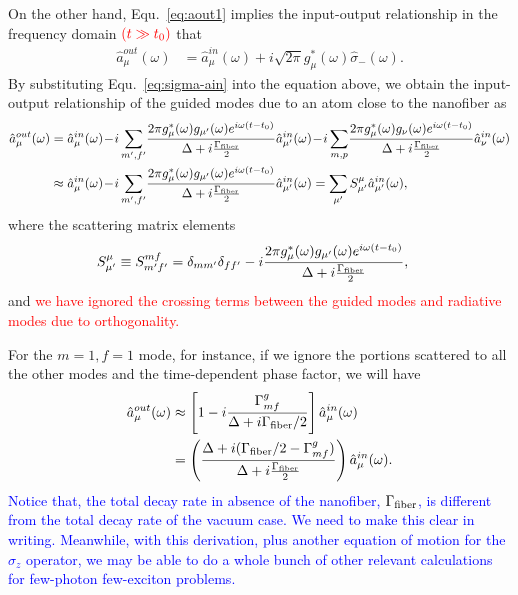\documentclass[preprint,aps,pra,onecolumn]{revtex4-1} %
\begin{document}
On the other hand, Equ.~\ref{eq:aout1} implies the input-output relationship in the frequency domain $\mathbin{\color{red}{(t\gg t_0)}}$ that
\begin{align}
\hat{a}^{out}_\mu(\omega ) &= \hat{a}^{in}_\mu(\omega) +i \sqrt{2\pi}g_\mu^*(\omega)\hat{\sigma}_-(\omega). 
\end{align}
By substituting Equ.~\ref{eq:sigma-ain} into the equation above, we obtain the input-output relationship of the guided modes due to an atom close to the nanofiber as
\begin{align}
\hat{a}^{out}_\mu(\omega) &= \hat{a}^{in}_\mu (\omega) \!-\! i\sum_{m',f'}\!\frac{2\pi g_\mu^*(\omega)g_{\mu'}(\omega)e^{i\omega(t-t_0)}}{\Delta+i\frac{\Gamma_{\rm fiber}}{2}}\hat{a}^{in}_{\mu'}(\omega) \!-\! i\sum_{m,p}\!\frac{2\pi g_\mu^*(\omega)g_{\nu}(\omega)e^{i\omega(t-t_0)}}{\Delta+i\frac{\Gamma_{\rm fiber}}{2}}\hat{a}^{in}_{\nu}(\omega)\\
&\approx \hat{a}^{in}_\mu (\omega) \!-\! i\sum_{m',f'}\!\frac{2\pi g_\mu^*(\omega)g_{\mu'}(\omega)e^{i\omega(t-t_0)}}{\Delta+i\frac{\Gamma_{\rm fiber}}{2}}\hat{a}^{in}_{\mu'}(\omega)=\sum_{\mu'}S^\mu_{\mu'}\hat{a}^{in}_{\mu'}(\omega),
\end{align}
where the scattering matrix elements
\begin{align}\label{eq:Smfmft}
S^\mu_{\mu'} &\equiv S^{mf}_{m'f'}=\delta_{mm'}\delta_{ff'}-i\frac{2\pi g_\mu^*(\omega)g_{\mu'}(\omega)e^{i\omega(t-t_0)}}{\Delta+i\frac{\Gamma_{\rm fiber}}{2}},
\end{align}
and \textcolor{red}{we have ignored the crossing terms between the guided modes and radiative modes due to orthogonality.} 

For the $m=1,f=1$ mode, for instance, if we ignore the portions scattered to all the other modes and the time-dependent phase factor, we will have 
\begin{align}
\hat{a}_{\mu}^{out}(\omega) &\approx \left[ 1- i\frac{\Gamma^g_{mf}}{\Delta+i\Gamma_{\rm fiber}/2}\right] \hat{a}^{in}_\mu(\omega) \\
&= \left(\frac{\Delta+i(\Gamma_{\rm fiber}/2-\Gamma^g_{mf})}{\Delta+i\frac{\Gamma_{\rm fiber}}{2}} \right)\hat{a}^{in}_\mu(\omega).
\end{align}
\textcolor{blue}{Notice that, the total decay rate in absence of the nanofiber, $\Gamma_{\rm fiber}$, is different from the total decay rate of the vacuum case. We need to make this clear in writing. Meanwhile, with this derivation, plus another equation of motion for the $\hat{\sigma}_z$ operator, we may be able to do a whole bunch of other relevant calculations for few-photon few-exciton problems. }
\end{document}
